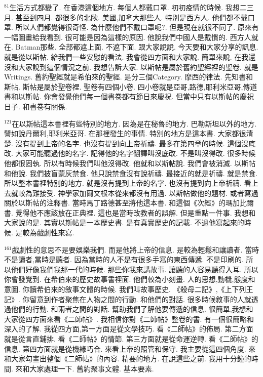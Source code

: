 \documentclass{book}
\begin{document}
$^{81}$生活方式都變了.
在香港這個地方.
每個人都戴口罩.
初初疫情的時候.
我想二三月.
甚至到四月.
都很多的北歐.
美國,加拿大那些人.
特別是西方人.
他們都不戴口罩.
所以人們都覺得很奇怪.
為什麼他們不戴口罩呢?.
但是現在就很不同了.
原來有一幅圖畫給我看到.
很可能是因為這樣的原因.
他說我們中國人是戴慣的.
西方人就在.
Batman那些.
全部都遮上面.
不遮下面.
跟大家說說.
今天要和大家分享的訊息.
就是從以斯帖.
給我們一些安慰的看法.
我會從四方面和大家說.
簡單來說.
在我還沒和大家說到這個情況之前.
我想告訴大家.
以斯帖是屬於舊約聖經裡的聖卷.
就是Writings.
舊約聖經就是希伯來的聖經.
是分三個Category.
摩西的律法.
先知書和斯帖.
斯帖是屬於聖卷裡.
聖卷有四個小卷.
四小卷就是亞哥,路德,耶利米亞哥,傳道書和以斯帖.
你會發覺他們每一個書卷都有節日來慶祝.
但當中只有以斯帖的慶祝日子.
和書卷有關係.

$^{121}$在以斯帖這本書裡有些特別的地方.
因為是在秘魯的地方.
巴勒斯坦以外的地方.
譬如說丹爾利,耶利米亞哥.
在那裡發生的事情.
特別的地方是這本書.
大家都很清楚.
沒有提到上帝的名字.
也沒有提到向上帝祈禱.
最多在第四章的時候.
這個沒底改.
大家可能聽過他的名字.
記得他的名字翻譯叫沒底改.
不是叫沒得改.
很多時候他都很固執.
所以有時候我們叫他沒得改.
他就和以斯帖說.
我們會被消滅.
以斯帖和他說.
我們披盲蒙灰禁食.
他只說禁食沒有說祈禱.
最接近的就是祈禱.
就是禁食.
所以整本書裡特別的地方.
就是沒有提到上帝的名字.
也沒有提到向上帝祈禱.
看上去就較為難接受.
神學家加爾文根本從來都沒有用過.
以斯帖做他的題材.
或者寫過關於以斯帖的注釋書.
當時馬丁路德甚至將他這本書.
和這個《次經》的瑪加比爾書.
覺得他不應該放在正典裡.
這也是當時改教者的誤解.
但是重點一件事.
我想和大家說的是.
其實以斯帖是一本歷史書.
是有真實歷史的記載.
不過他寫起來的時候.
是較為戲劇性來寫.

$^{161}$戲劇性的意思不是要娛樂我們.
而是他將上帝的信息.
是較為輕鬆和讓讀者.
當時不是讀者,當時是聽者.
因為當時的人不是有很多手寫的東西傳遞.
不是印刷的.
所以他們好像我們我那一代的時候.
那些你我來講故事.
讓聽的人容易聽得入耳.
所以你會發覺到.
在希伯來的歷史故事書裡面.
他們較為小刻畫.
人的思想,動機,態度和意圖.
你讀希伯來的敘事文體的時候.
我們叫故事歷史.
《殺母二記》,《上下列王記》.
你留意到作者聚焦在人物之間的行動.
和他們的對話.
很多時候敘事的人就透過他們的行動.
和兩者之間的對話.
幫助我們了解他要傳遞的信息.
很簡單,我想和大家從四方面來看《二師帖》.
我相信你對《二師帖》整卷的書.
有一個很簡略和深入的了解.
我從四方面,第一方面是從文學技巧.
看《二師帖》的佈局.
第二方面就是從言直鋪排.
看《二師帖》的情節.
第三方面就是從命運逆轉.
看《二師帖》的信息.
第四方面就是從機緣巧合.
來看上帝的照管和保守.
我主要從這四個角度.
來和大家勾畫出整個《二師帖》的內容.
精要的地方.
在說這些之前.
我用十分鐘的時間.
來和大家處理一下.
舊約聚事文體.
基本要素.
\end{document}
